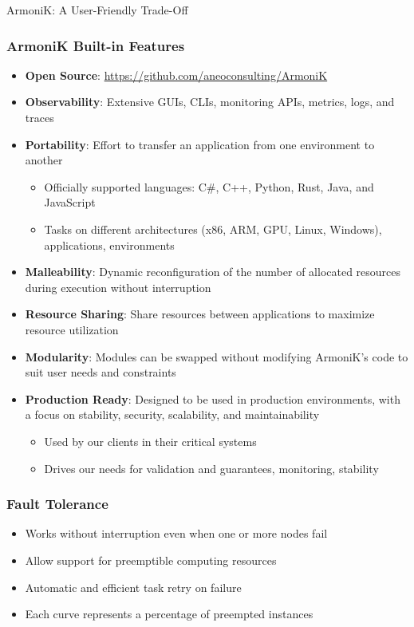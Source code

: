 \documentclass[10pt,aspectratio=1609]{beamer}
\begin{document}
\begin{section}{ArmoniK: A User-Friendly Trade-Off}
 \begin{frame}
   \frametitle{ArmoniK Built-in Features}
   \begin{itemize}
     \item \textbf{Open Source}: \url{https://github.com/aneoconsulting/ArmoniK}
     \item \textbf{Observability}: Extensive GUIs, CLIs, monitoring APIs, metrics, logs, and traces
     \item \textbf{Portability}: Effort to transfer an application from one environment to another
           \begin{itemize}
             \item Officially supported languages: C\#, C++, Python, Rust, Java, and JavaScript
             \item Tasks on different architectures (x86, ARM, GPU, Linux, Windows), applications, environments
           \end{itemize}
     \item \textbf{Malleability}: Dynamic reconfiguration of the number of allocated resources during execution without interruption
     \item \textbf{Resource Sharing}: Share resources between applications to maximize resource utilization
     \item \textbf{Modularity}: Modules can be swapped without modifying ArmoniK's code to suit user needs and constraints
     \item \textbf{Production Ready}: Designed to be used in production environments, with a focus on stability, security, scalability, and maintainability
           \begin{itemize}
             \item Used by our clients in their critical systems
             \item Drives our needs for validation and guarantees, monitoring, stability
           \end{itemize}
   \end{itemize}
 \end{frame}

 \begin{frame}
   \frametitle{Fault Tolerance}
   \begin{itemize}
     \item Works without interruption even when one or more nodes fail
     \item Allow support for preemptible computing resources
     \item Automatic and efficient task retry on failure
     \item Each curve represents a percentage of preempted instances
   \end{itemize}
   \begin{center}
     \vspace{0.2ex}
     
   \end{center}
 \end{frame}


\end{section}
\end{document}

